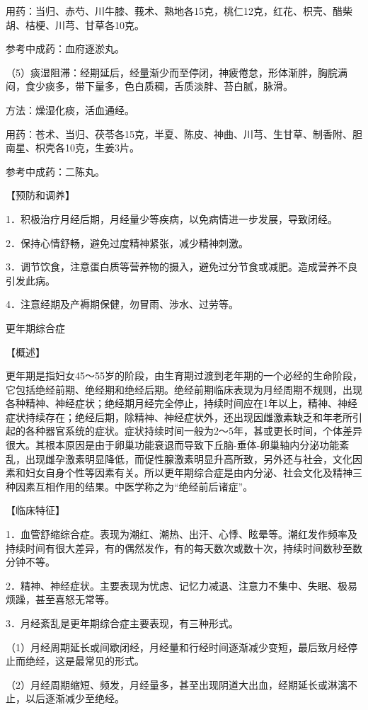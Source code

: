 \documentclass[12pt,UTF8]{ctexbook}
\begin{document}
用药：当归、赤芍、川牛膝、莪术、熟地各15克，桃仁12克，红花、枳壳、醋柴胡、桔梗、川芎、甘草各10克。

参考中成药：血府逐淤丸。

（5）痰湿阻滞：经期延后，经量渐少而至停闭，神疲倦怠，形体渐胖，胸脘满闷，食少痰多，带下量多，色白质稠，舌质淡胖、苔白腻，脉滑。

方法：燥湿化痰，活血通经。

用药：苍术、当归、茯苓各15克，半夏、陈皮、神曲、川芎、生甘草、制香附、胆南星、枳壳各10克，生姜3片。

参考中成药：二陈丸。

【预防和调养】

1．积极治疗月经后期，月经量少等疾病，以免病情进一步发展，导致闭经。

2．保持心情舒畅，避免过度精神紧张，减少精神刺激。

3．调节饮食，注意蛋白质等营养物的摄入，避免过分节食或减肥。造成营养不良引发此病。

4．注意经期及产褥期保健，勿冒雨、涉水、过劳等。





更年期综合症


【概述】

更年期是指妇女45～55岁的阶段，由生育期过渡到老年期的一个必经的生命阶段，它包括绝经前期、绝经期和绝经后期。绝经前期临床表现为月经周期不规则，出现各种精神、神经症状；绝经期月经完全停止，持续时间应在1年以上，精神、神经症状持续存在；绝经后期，除精神、神经症状外，还出现因雌激素缺乏和年老所引起的各种器官系统的症状。症状持续时间一般为2～5年，甚或更长时间，个体差异很大。其根本原因是由于卵巢功能衰退而导致下丘脑-垂体-卵巢轴内分泌功能紊乱，出现雌孕激素明显降低，而促性腺激素明显升高所致，另外还与社会，文化因素和妇女自身个性等因素有关。所以更年期综合症是由内分泌、社会文化及精神三种因素互相作用的结果。中医学称之为“绝经前后诸症”。

【临床特征】

1．血管舒缩综合症。表现为潮红、潮热、出汗、心悸、眩晕等。潮红发作频率及持续时间有很大差异，有的偶然发作，有的每天数次或数十次，持续时间数秒至数分钟不等。

2．精神、神经症状。主要表现为忧虑、记忆力减退、注意力不集中、失眠、极易烦躁，甚至喜怒无常等。

3．月经紊乱是更年期综合症主要表现，有三种形式。

（1）月经周期延长或间歇闭经，月经量和行经时间逐渐减少变短，最后致月经停止而绝经，这是最常见的形式。

（2）月经周期缩短、频发，月经量多，甚至出现阴道大出血，经期延长或淋漓不止，以后逐渐减少至绝经。
\end{document}

